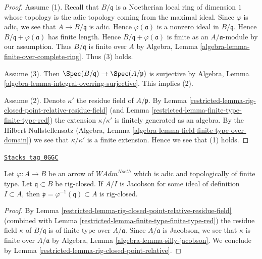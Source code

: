 \begin{proof}

Assume (1). Recall that $B/\mathfrak q$ is a Noetherian local ring
of dimension $1$ whose topology is the adic topology coming
from the maximal ideal. Since $\varphi$ is adic, we see that
$A \to B/\mathfrak q$ is adic. Hence $\varphi(\mathfrak a)$
is a nonzero ideal in $B/\mathfrak q$. Hence
$B/\mathfrak q + \varphi(\mathfrak a)$
has finite length. Hence $B/\mathfrak q + \varphi(\mathfrak a)$
is finite as an $A/\mathfrak a$-module by our assumption.
Thus $B/\mathfrak q$ is finite over $A$ by
Algebra, Lemma \ref{algebra-lemma-finite-over-complete-ring}.
Thus (3) holds.

\medskip\noindent
Assume (3). Then $\Spec(B/\mathfrak q) \to \Spec(A/\mathfrak p)$
is surjective by
Algebra, Lemma \ref{algebra-lemma-integral-overring-surjective}.
This implies (2).

\medskip\noindent
Assume (2). Denote $\kappa'$ the residue field of $A/\mathfrak p$.
By Lemma \ref{restricted-lemma-rig-closed-point-relative-residue-field}
(and Lemma \ref{restricted-lemma-finite-type-finite-type-red})
the extension $\kappa/\kappa'$ is finitely generated as an algebra.
By the Hilbert Nullstellensatz (Algebra, Lemma
\ref{algebra-lemma-field-finite-type-over-domain})
we see that $\kappa/\kappa'$ is a finite extension.
Hence we see that (1) holds.
\end{proof}

\begin{lemma}
\label{restricted-lemma-rig-closed-jacobson}
\href{https://stacks.math.columbia.edu/tag/0GGC}{\texttt{Stacks tag 0GGC}}

Let $\varphi : A \to B$ be an arrow of $\textit{WAdm}^{Noeth}$
which is adic and topologically of finite type.
Let $\mathfrak q \subset B$ be rig-closed.
If $A/I$ is Jacobson for some ideal of definition $I \subset A$, then
$\mathfrak p = \varphi^{-1}(\mathfrak q) \subset A$
is rig-closed.
\end{lemma}

\begin{proof}

By Lemma \ref{restricted-lemma-rig-closed-point-relative-residue-field}
(combined with Lemma \ref{restricted-lemma-finite-type-finite-type-red})
the residue field $\kappa$ of $B/\mathfrak q$ is of finite type over
$A/\mathfrak a$. Since $A/\mathfrak a$ is Jacobson, we
see that $\kappa$ is finite over $A/\mathfrak a$ by
Algebra, Lemma \ref{algebra-lemma-silly-jacobson}.
We conclude by Lemma \ref{restricted-lemma-rig-closed-point-relative}.
\end{proof}

